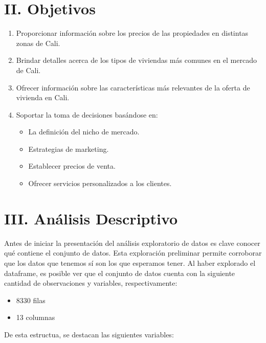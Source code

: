 \documentclass[conference,final,]{IEEEtran}
\providecommand{\tightlist}{%
  \setlength{\itemsep}{0pt}\setlength{\parskip}{0pt}}
\begin{document}
\section{II. Objetivos}

\begin{enumerate}
\def\labelenumi{\arabic{enumi}.}
\item
  Proporcionar información sobre los precios de las propiedades en
  distintas zonas de Cali.
\item
  Brindar detalles acerca de los tipos de viviendas más comunes en el
  mercado de Cali.
\item
  Ofrecer información sobre las características más relevantes de la
  oferta de vivienda en Cali.
\item
  Soportar la toma de decisiones basándose en:

  \begin{itemize}
    \item La definición del nicho de mercado.
    \item Estrategias de marketing.
    \item Establecer precios de venta.
    \item Ofrecer servicios personalizados a los clientes.
  \end{itemize}
\end{enumerate}

\section{III. Análisis Descriptivo}

Antes de iniciar la presentación del análisis exploratorio de datos es
clave conocer qué contiene el conjunto de datos. Esta exploración
preliminar permite corroborar que los datos que tenemos sí son los que
esperamos tener. Al haber explorado el dataframe, es posible ver que el
conjunto de datos cuenta con la siguiente cantidad de observaciones y
variables, respectivamente:

\begin{itemize}
\tightlist
\item
  8330 filas
\item
  13 columnas
\end{itemize}

De esta estructua, se destacan las siguientes variables:
\end{document}
